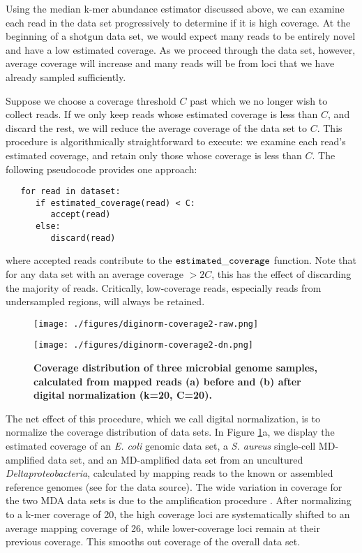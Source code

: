 Using the median k-mer abundance estimator discussed above, we can examine each
read in the data set progressively to determine if it is high coverage.  At the
beginning of a shotgun data set, we would expect many reads to be entirely
novel and have a low estimated coverage.  As we proceed through the data set,
however, average coverage will increase and many reads will be from loci that
we have already sampled sufficiently.

Suppose we choose a coverage threshold $C$ past which we no longer wish to
collect reads. If we only keep reads whose estimated coverage is less than $C$,
and discard the rest, we will reduce the average coverage of the data set to
$C$.  This procedure is algorithmically straightforward to execute: we examine
each read's estimated coverage, and retain only those whose coverage is less
than $C$. The following pseudocode provides one approach: 
\begin{verbatim}
   for read in dataset:
      if estimated_coverage(read) < C:
         accept(read)
      else:
         discard(read)
\end{verbatim}
\noindent
\noindent 
where accepted reads contribute to the
$\tt estimated\_coverage$ function.  Note that for any data set with an average
coverage $> 2C$, this has the effect of discarding the majority of reads.
Critically, low-coverage reads, especially reads from undersampled regions,
will always be retained.


\begin{figure}[!ht]
\centerline{\texttt{[image: ./figures/diginorm-coverage2-raw.png]}}
\centerline{\texttt{[image: ./figures/diginorm-coverage2-dn.png]}}
\caption{
{\bf Coverage distribution of three microbial genome samples, calculated
from mapped reads (a) before and (b) after digital normalization (k=20, C=20).}}
\label{fig:coverage}
\end{figure}


The net effect of this procedure, which we call digital normalization, is to
normalize the coverage distribution of data sets.  In Figure
\ref{fig:coverage}a, we display the estimated coverage of an {\em E. coli}
genomic data set, a {\em S. aureus} single-cell MD-amplified data set, and an
MD-amplified data set from an uncultured {\em Deltaproteobacteria}, calculated
by mapping reads to the known or assembled reference genomes (see
\cite{pubmed21926975} for the data source).  The wide variation in coverage for
the two MDA data sets is due to the amplification procedure
\cite{pubmed17487184}.  After normalizing to a k-mer coverage of 20, the high
coverage loci are systematically shifted to an average mapping coverage of 26,
while lower-coverage loci remain at their previous coverage.  This smooths out
coverage of the overall data set.


